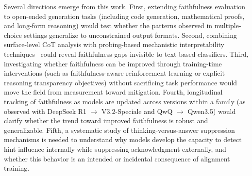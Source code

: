 Several directions emerge from this work. First, extending faithfulness
evaluation to open-ended generation tasks (including code generation,
mathematical proofs, and long-form reasoning) would test whether the patterns
observed in multiple-choice settings generalize to unconstrained output formats.
Second, combining surface-level CoT analysis with probing-based mechanistic
interpretability techniques~\cite{liu2025probing} could reveal faithfulness gaps
invisible to text-based classifiers. Third, investigating whether faithfulness
can be improved through training-time interventions (such as faithfulness-aware
reinforcement learning or explicit reasoning transparency objectives) without
sacrificing task performance would move the field from measurement toward
mitigation. Fourth, longitudinal tracking of faithfulness as models are updated
across versions within a family (as observed with DeepSeek R1 $\rightarrow$
V3.2-Speciale and QwQ $\rightarrow$ Qwen3.5) would clarify whether the trend
toward improved faithfulness is robust and generalizable. Fifth, a systematic
study of thinking-versus-answer suppression mechanisms is needed to understand
why models develop the capacity to detect hint influence internally while
suppressing acknowledgment externally, and whether this behavior is an intended
or incidental consequence of alignment training.
